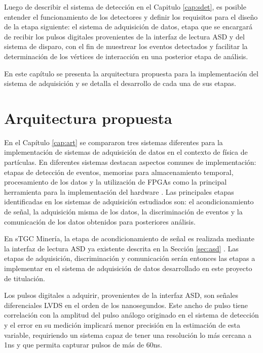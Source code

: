 Luego de describir el sistema de detección en el Capitulo \ref{cap:sdet}, es posible entender el funcionamiento de los detectores y definir los requisitos para el diseño de la etapa siguiente: el sistema de adquisición de datos, etapa que se encargará de recibir los pulsos digitales provenientes de la interfaz de lectura ASD y del sistema de disparo, con el fin de muestrear los eventos detectados y facilitar la determinación de los vértices de interacción en una posterior etapa de análisis.

En este capítulo se presenta la arquitectura propuesta para la implementación del sistema de adquisición y se detalla el desarrollo de cada una de sus etapas.

\section{Arquitectura propuesta}
\label{sec:arq}

	En el Capítulo \ref{cap:art} se compararon tres sistemas diferentes para la implementación de sistemas de adquisición de datos en el contexto de física de partículas. En diferentes sistemas destacan aspectos comunes de implementación: etapas de detección de eventos, memorias para almacenamiento temporal, procesamiento de los datos y la utilización de FPGAs como la principal herramienta para la implementación del hardware . Las principales etapas identificadas en los sistemas de adquisición estudiados son: el acondicionamiento de señal, la adquisición misma de los datos, la discriminación de eventos y la comunicación de los datos obtenidos para posteriores análisis.
	
	En sTGC Minería, la etapa de acondicionamiento de señal es realizada mediante la interfaz de lectura ASD ya existente descrita en la Sección \ref{sec:asd} . Las etapas de adquisición, discriminación y comunicación serán entonces las etapas a implementar en el sistema de adquisición de datos desarrollado en este proyecto de titulación.
	
	Los pulsos digitales a adquirir, provenientes de la interfaz ASD, son señales diferenciales LVDS en el orden de los nanosegundos\cite{1999ATLASICs}. Este ancho de pulso tiene correlación con la amplitud del pulso análogo originado en el sistema de detección y el error en su medición implicará menor precisión en la estimación de esta variable, requiriendo un sistema capaz de tener una resolución lo más cercana a 1ns y que permita capturar pulsos de más de 60ns. 
	
